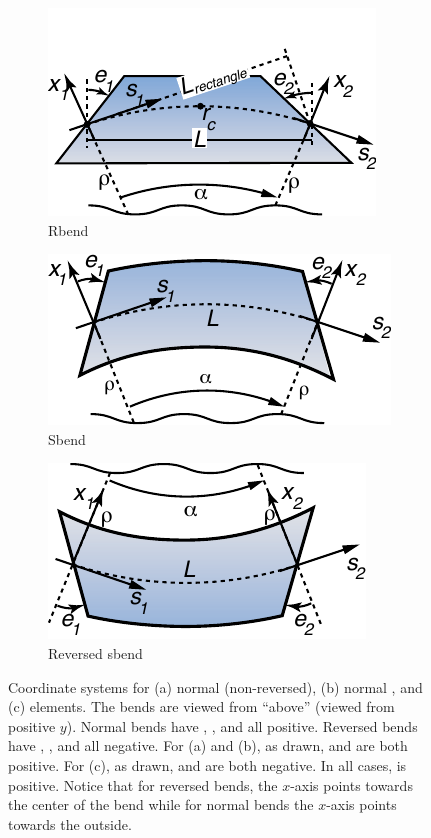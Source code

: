 \begin{figure}[tb]
  \centering
  \hfill
  \begin{subfigure}[b]{0.32\textwidth}
    \includegraphics{rbend-coords.pdf}
    \caption{Rbend}
    \label{f:rbend}
  \end{subfigure}
  \hfill
  \begin{subfigure}[b]{0.32\textwidth}
    \includegraphics{sbend-coords.pdf}
    \caption{Sbend}
    \label{f:sbend}
  \end{subfigure}
  \hfill
  \begin{subfigure}[b]{0.32\textwidth}
    \includegraphics{sbend-rev.pdf}
    \caption{Reversed sbend}
    \label{f:sbend.rev}
  \end{subfigure}
  \hfill
  \caption[Coordinate systems for rbend and sbend elements.]
{Coordinate systems for (a) normal (non-reversed), (b) normal , and (c)
 elements. The bends are viewed from ``above'' (viewed from positive $y$).
Normal bends have , , and  all positive. Reversed bends have ,
, and  all negative. For (a) and (b), as drawn,  and  are both
positive. For (c), as drawn,  and  are both negative. In all cases,  is
positive. Notice that for reversed bends, the $x$-axis points towards the center of the bend while
for normal bends the $x$-axis points towards the outside.}
  \label{f:bend}
\end{figure}

